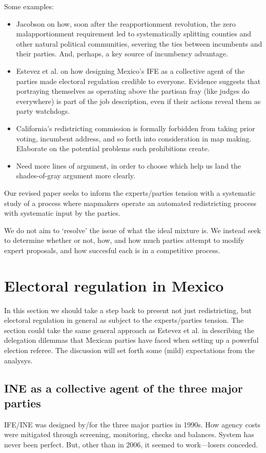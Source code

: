 \documentclass[12pt]{article}
\begin{document}
Some examples:
\begin{itemize}
\item Jacobson on how, soon after the reapportionment revolution, the zero malapportionment requirement led to systematically splitting counties and other natural political communities, severing the ties between incumbents and their parties. And, perhaps, a key source of incumbency advantage.
\item Estevez et al. on how designing Mexico's IFE as a collective agent of the parties made electoral regulation credible to everyone. Evidence suggests that portraying themselves as operating above the partisan fray (like judges do everywhere) is part of the job description, even if their actions reveal them as party watchdogs.
\item California's redistricting commission is formally forbidden from taking prior voting, incumbent address, and so forth into consideration in map making. Elaborate on the potential problems such prohibitions create.
\item Need more lines of argument, in order to choose which help us land the shades-of-gray argument more clearly.
\end{itemize}
Our revised paper seeks to inform the experts/parties tension with a systematic study of a process where mapmakers operate an automated redistricting process with systematic input by the parties. 

We do not aim to `resolve' the issue of what the ideal mixture is. We instead seek to determine whether or not, how, and how much parties attempt to modify expert proposals, and how succesful each is in a competitive process. 
\section{Electoral regulation in Mexico}
\label{sec:orge5b6785}
In this section we should take a step back to present not just redistricting, but electoral regulation in general as subject to the experts/parties tension. The section could take the same general approach as Estevez et al. in describing the delegation dilemmas that Mexican parties have faced when setting up a powerful election referee. The discussion will set forth some (mild) expectations from the analysys.
\subsection{INE as a collective agent of the three major parties}
\label{sec:org19a52f1}
IFE/INE was designed by/for the three major parties in 1990s. How agency costs were mitigated through screening, monitoring, checks and balances. System has never been perfect. But, other than in 2006, it seemed to work---losers conceded.  
\end{document}
